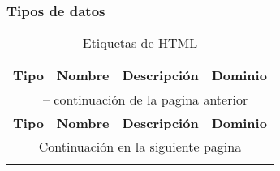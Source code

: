 \documentclass[12pt]{report}
\begin{document}
			\subsubsection{Tipos de datos}
					\begin{center}
						\begin{longtable}{c m{2.5cm} m{4cm} m{5cm}}
							\caption{Etiquetas de HTML}\\
							\textbf{Tipo}	&	\textbf{Nombre}	&	\textbf{Descripción}	&	\textbf{Dominio}\\[0.5cm]\hline
							\endfirsthead
							\multicolumn{4}{c}{\tablename\ \thetable{} -- continuación de la pagina anterior}\\
							\textbf{Tipo}	&	\textbf{Nombre}	&	\textbf{Descripción}	&	\textbf{Dominio}\\[0.5cm]\hline
							\endhead
							\hline\multicolumn{4}{c}{Continuación en la siguiente pagina}\\\hline
							\endfoot
							\hline
							\endlastfoot
							

\end{longtable}
\end{center}
\end{document}
